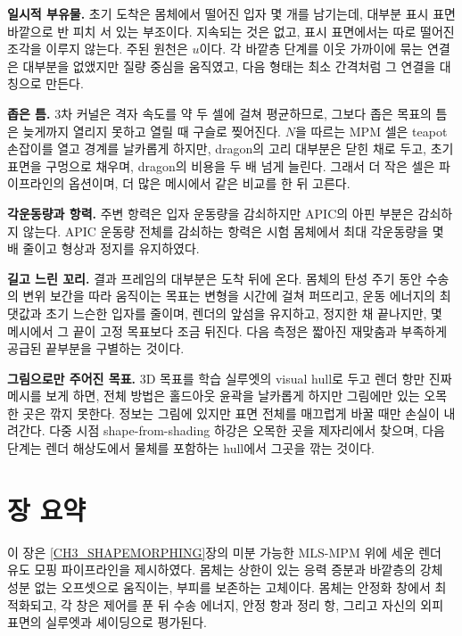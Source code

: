 \textbf{일시적 부유물.} 초기 도착은 몸체에서 떨어진 입자 몇 개를 남기는데, 대부분 표시 표면 바깥으로 반 피치 서 있는 부조이다.
지속되는 것은 없고, 표시 표면에서는 따로 떨어진 조각을 이루지 않는다. 주된 원천은 $u$이다. 각 바깥층 단계를 이웃 가까이에
묶는 연결은 대부분을 없앴지만 질량 중심을 움직였고, 다음 형태는 최소 간격처럼 그 연결을 대칭으로 만든다.

\textbf{좁은 틈.} 3차 커널은 격자 속도를 약 두 셀에 걸쳐 평균하므로, 그보다 좁은 목표의 틈은 늦게까지 열리지 못하고 열릴 때
구슬로 찢어진다. $N$을 따르는 MPM 셀은 teapot 손잡이를 열고 경계를 날카롭게 하지만, dragon의 고리 대부분은 닫힌 채로 두고,
초기 표면을 구멍으로 채우며, dragon의 비용을 두 배 넘게 늘린다. 그래서 더 작은 셀은 파이프라인의 옵션이며, 더 많은 메시에서
같은 비교를 한 뒤 고른다.

\textbf{각운동량과 항력.} 주변 항력은 입자 운동량을 감쇠하지만 APIC의 아핀 부분은 감쇠하지 않는다. APIC 운동량 전체를 감쇠하는
항력은 시험 몸체에서 최대 각운동량을 몇 배 줄이고 형상과 정지를 유지하였다.

\textbf{길고 느린 꼬리.} 결과 프레임의 대부분은 도착 뒤에 온다. 몸체의 탄성 주기 동안 수송의 변위 보간을 따라 움직이는 목표는
변형을 시간에 걸쳐 퍼뜨리고, 운동 에너지의 최댓값과 초기 느슨한 입자를 줄이며, 렌더의 앞섬을 유지하고, 정지한 채 끝나지만,
몇 메시에서 그 끝이 고정 목표보다 조금 뒤진다. 다음 측정은 짧아진 재맞춤과 부족하게 공급된 끝부분을 구별하는 것이다.

\textbf{그림으로만 주어진 목표.} 3D 목표를 학습 실루엣의 visual hull로 두고 렌더 항만 진짜 메시를 보게 하면, 전체 방법은
홀드아웃 윤곽을 날카롭게 하지만 그림에만 있는 오목한 곳은 깎지 못한다. 정보는 그림에 있지만 표면 전체를 매끄럽게 바꿀 때만
손실이 내려간다. 다중 시점 shape-from-shading 하강은 오목한 곳을 제자리에서 찾으며, 다음 단계는 렌더 해상도에서 물체를
포함하는 hull에서 그곳을 깎는 것이다.

\section{장 요약}
\label{ch4:sec_summary_ko}

이 장은 \ref{CH3_SHAPEMORPHING}장의 미분 가능한 MLS-MPM 위에 세운 렌더 유도 모핑 파이프라인을 제시하였다. 몸체는 상한이 있는
응력 증분과 바깥층의 강체 성분 없는 오프셋으로 움직이는, 부피를 보존하는 고체이다. 몸체는 안정화 창에서 최적화되고, 각 창은
제어를 푼 뒤 수송 에너지, 안정 항과 정리 항, 그리고 자신의 외피 표면의 실루엣과 셰이딩으로 평가된다.

